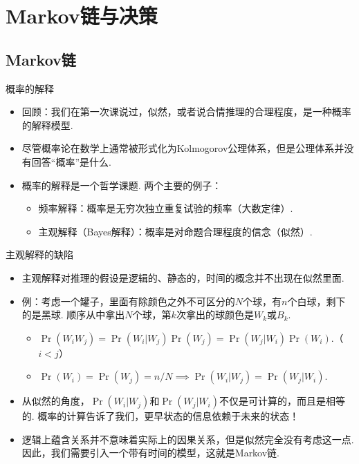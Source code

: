 \chapter{Markov链与决策}\label{chap:markov-chain}

\begingroup
\newcommand{\pref}{Chapters/Markov-chain/figures}

\renewcommand{\P}{\mathcal P}
\newcommand{\MS}{\mathcal S}
\newcommand{\M}{\mathcal M}

\section{Markov链}

概率的解释

\begin{itemize}
    \item 回顾：我们在第一次课说过，似然，或者说合情推理的合理程度，是一种概率的解释模型.
    \item 尽管概率论在数学上通常被形式化为Kolmogorov公理体系，但是公理体系并没有回答``概率''是什么.
    \item 概率的解释是一个哲学课题. 两个主要的例子：
    \begin{itemize}
    \item 频率解释：概率是无穷次独立重复试验的频率（大数定律）.
    \item 主观解释（Bayes解释）：概率是对命题合理程度的信念（似然）.
    \end{itemize}
\end{itemize}


{主观解释的缺陷}
\begin{itemize}
    \item 主观解释对推理的假设是逻辑的、静态的，时间的概念并不出现在似然里面.
    \item 例：考虑一个罐子，里面有除颜色之外不可区分的$N$个球，有$n$个白球，剩下的是黑球. 顺序从中拿出$N$个球，第$k$次拿出的球颜色是$W_k$或$B_k$.
    \begin{itemize}
        \item $\Pr(W_iW_j)=\Pr(W_i|W_j)\Pr(W_j)=\Pr(W_j|W_i)\Pr(W_i)$.（$i<j$）
        \item $\Pr(W_i)=\Pr(W_j)=n/N\implies\Pr(W_i|W_j)=\Pr(W_j|W_i)$.
    \end{itemize}
    \item 从似然的角度，$\Pr(W_i|W_j)$和$\Pr(W_j|W_i)$不仅是可计算的，而且是相等的. 概率的计算告诉了我们，更早状态的信息依赖于未来的状态！
    \item 逻辑上蕴含关系并不意味着实际上的因果关系，但是似然完全没有考虑这一点. 因此，我们需要引入一个带有时间的模型，这就是Markov链.
\end{itemize}


